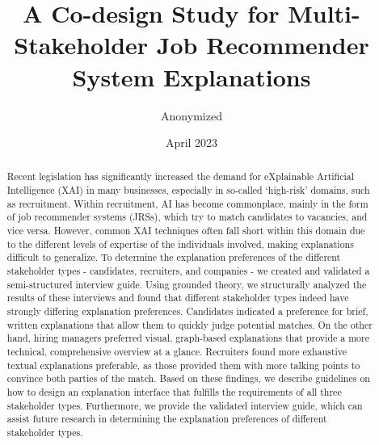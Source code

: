 \documentclass[runningheads]{llncs}
\begin{document}
\title{A Co-design Study for Multi-Stakeholder Job Recommender System Explanations}


\author{Anonymized}


\date{April 2023}






\maketitle

\begin{abstract}
    Recent legislation has significantly increased the demand for eXplainable Artificial Intelligence (XAI) in many businesses, especially in so-called `high-risk' domains, such as recruitment. Within recruitment, AI has become commonplace, mainly in the form of job recommender systems (JRSs), which try to match candidates to vacancies, and vice versa. However, common XAI techniques often fall short within this domain due to the different levels of expertise of the individuals involved, making explanations difficult to generalize. To determine the explanation preferences of the different stakeholder types - candidates, recruiters, and companies - we created and validated a semi-structured interview guide. Using grounded theory, we structurally analyzed the results of these interviews and found that different stakeholder types indeed have strongly differing explanation preferences. Candidates indicated a preference for brief, written explanations that allow them to quickly judge potential matches. On the other hand, hiring managers preferred visual, graph-based explanations that provide a more technical, comprehensive overview at a glance. Recruiters found more exhaustive textual explanations preferable, as those provided them with more talking points to convince both parties of the match. Based on these findings, we describe guidelines on how to design an explanation interface that fulfills the requirements of all three stakeholder types. Furthermore, we provide the validated interview guide, which can assist future research in determining the explanation preferences of different stakeholder types. 
\end{abstract}









% 



\end{document}
